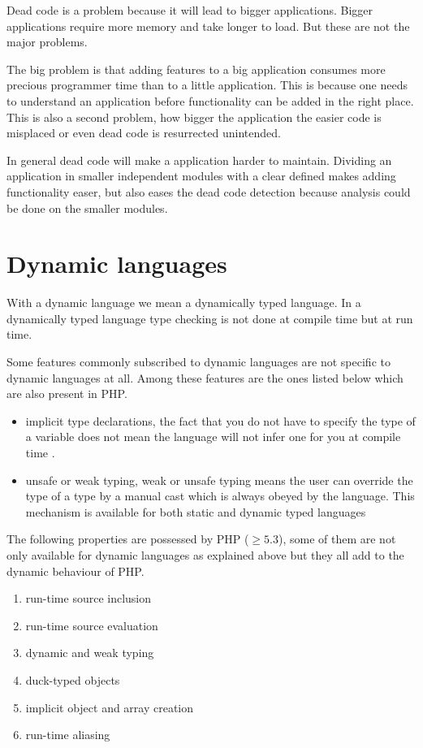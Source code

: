 \documentclass[a4paper,10pt,twocolumn]{article}
\begin{document}
Dead code is a problem because it will lead to bigger applications. Bigger applications require more memory and take longer to load. But these are not the major problems.

The big problem is that adding features to a big application consumes more precious programmer time than to a little application\cite{godfrey2000}. This is because one needs to understand an application before functionality can be added in the right place. This is also a second problem, how bigger the application the easier code is misplaced or even dead code is resurrected unintended.

In general dead code will make a application harder to maintain. Dividing an application in smaller independent modules with a clear defined makes adding functionality easer\cite{godfrey2000}, but also eases the dead code detection because analysis could be done on the smaller modules.

\section{Dynamic languages}
\label{sec:dynamic}

With a dynamic language we mean a dynamically typed language. In a dynamically typed language type checking is not done at compile time but at run time.

Some features commonly subscribed to dynamic languages are not specific to dynamic languages at all. Among these features are the ones listed below which are also present in PHP.

\begin{itemize}
\item implicit type declarations, the fact that you do not have to specify the type of a variable does not mean the language will not infer one for you at compile time \cite{tratt2009}.
\item unsafe or weak typing, weak or unsafe typing means the user can override the type of a type by a manual cast which is always obeyed by the language. This mechanism is available for both static and dynamic typed languages
\end{itemize}

The following properties are possessed by PHP ($\geq 5.3$)\cite{php}, some of them are not only available for dynamic languages as explained above but they all add to the dynamic behaviour of PHP\cite{biggar2009draft,biggar2010}.

\begin{enumerate}
\item run-time source inclusion
\item run-time source evaluation
\item dynamic and weak typing
\item duck-typed objects
\item implicit object and array creation
\item run-time aliasing
\end{enumerate}
\end{document}
